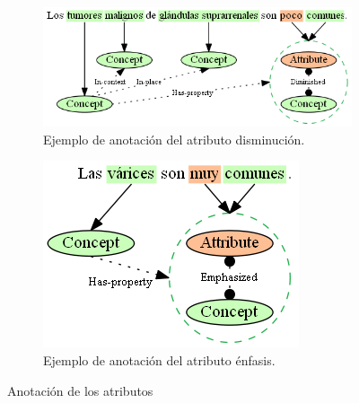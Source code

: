 \begin{figure}[H]
	\begin{subfigure}{4.2in}
		\includegraphics[width=\linewidth]{graphics/annotation_example_attribute_diminished.png}
		\caption{Ejemplo de anotación del atributo disminución.}
		\vspace{0.3in}
		\label{fig:annotation_example_attribute_diminished}
	\end{subfigure}
	\begin{subfigure}{2.3in}
		\includegraphics[width=\linewidth]{graphics/annotation_example_attribute_emphasized.png}
		\caption{Ejemplo de anotación del atributo énfasis.}
		\label{fig:annotation_example_attribute_emphasized}
	\end{subfigure}
	\caption{Anotación de los atributos}
	\label{fig:annotation_examples_attributes}
\end{figure}

